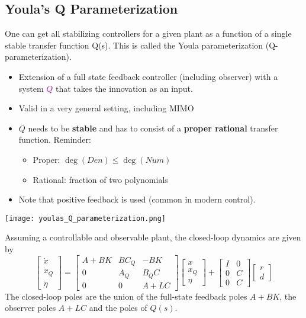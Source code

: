 \subsection{Youla's Q Parameterization}
One can get all stabilizing controllers for a given plant as a function of a single stable transfer function Q(s). This is called the Youla parameterization (Q-parameterization).
\begin{itemize}
    \item Extension of a full state feedback controller (including observer) with a system \textcolor{purple}{$Q$} that takes the innovation as an input.
    \item Valid in a very general setting, including MIMO
    \item $Q$ needs to be \textbf{stable} and has to consist of a \textbf{proper rational} transfer function. Reminder:
          \begin{itemize}
              \item Proper: $\deg(Den)\le \deg(Num)$
              \item Rational: fraction of two polynomials
          \end{itemize}
    \item Note that positive feedback is used (common in modern control).
\end{itemize}

\begin{center}
    \texttt{[image: youlas\_Q\_parameterization.png]}
\end{center}
\newpar{}
Assuming a controllable and observable plant, the closed-loop dynamics are given by
\begin{equation*}
    \begin{bmatrix}
        \dot{x}   \\
        \dot{x}_Q \\
        \dot{\eta}
    \end{bmatrix}
    =
    \begin{bmatrix}
        A+BK & BC_Q & -BK   \\
        0    & A_Q  & B_Q C \\
        0    & 0    & A+LC
    \end{bmatrix}
    \begin{bmatrix}
        x   \\
        x_Q \\
        \eta
    \end{bmatrix}
    +
    \begin{bmatrix}
        I & 0 \\
        0 & C \\
        0 & C
    \end{bmatrix}
    \begin{bmatrix}
        r \\
        d
    \end{bmatrix}
\end{equation*}
The closed-loop poles are the union of the full-state feedback poles $A+BK$, the observer poles $A+LC$ and the poles of $Q(s)$.

